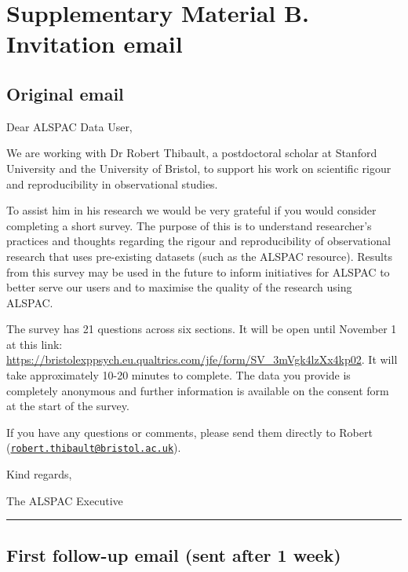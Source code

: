 \documentclass[
  man,floatsintext]{apa6}
\begin{document}
\pagebreak

\hypertarget{supplementary-material-b.-invitation-email}{%
\section{Supplementary Material B. Invitation email}\label{supplementary-material-b.-invitation-email}}

\hypertarget{original-email}{%
\subsection{Original email}\label{original-email}}

Dear ALSPAC Data User,

We are working with Dr Robert Thibault, a postdoctoral scholar at Stanford University and the University of Bristol, to support his work on scientific rigour and reproducibility in observational studies.

To assist him in his research we would be very grateful if you would consider completing a short survey. The purpose of this is to understand researcher's practices and thoughts regarding the rigour and reproducibility of observational research that uses pre-existing datasets (such as the ALSPAC resource). Results from this survey may be used in the future to inform initiatives for ALSPAC to better serve our users and to maximise the quality of the research using ALSPAC.

The survey has 21 questions across six sections. It will be open until November 1 at this link: \url{https://bristolexppsych.eu.qualtrics.com/jfe/form/SV_3mVgk4lzXx4kp02}. It will take approximately 10-20 minutes to complete. The data you provide is completely anonymous and further information is available on the consent form at the start of the survey.

If you have any questions or comments, please send them directly to Robert (\href{mailto:robert.thibault@bristol.ac.uk}{\nolinkurl{robert.thibault@bristol.ac.uk}}).

Kind regards,

The ALSPAC Executive

\begin{center}\rule{0.5\linewidth}{0.5pt}\end{center}

\hypertarget{first-follow-up-email-sent-after-1-week}{%
\subsection{First follow-up email (sent after 1 week)}\label{first-follow-up-email-sent-after-1-week}}
\end{document}
